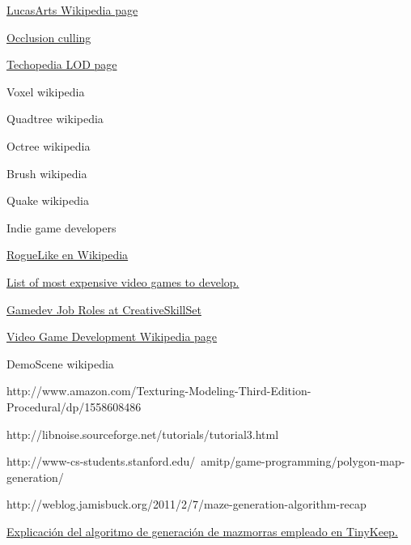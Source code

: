 \begin{thebibliography}{99}


 \href{https://es.wikipedia.org/wiki/LucasArts}{LucasArts Wikipedia page}

 \href{https://en.wikipedia.org/wiki/Hidden_surface_determination}{Occlusion culling}

 \href{http://www.techopedia.com/definition/11791/level-of-detail-lod}{Techopedia LOD page}

 Voxel wikipedia

 Quadtree wikipedia

 Octree wikipedia

 Brush wikipedia

 Quake wikipedia

 Indie game developers

 \href{https://es.wikipedia.org/wiki/Roguelike}{RogueLike en Wikipedia}

 \href{https://en.wikipedia.org/wiki/List_of_most_expensive_video_games_to_develop}{List of most expensive video games to develop.}

 \href{http://creativeskillset.org/creative_industries/games/job_roles}{Gamedev Job Roles at CreativeSkillSet}

 \href{https://en.wikipedia.org/wiki/Video_game_development#Roles}{Video Game Development Wikipedia page}

 DemoScene wikipedia

 http://www.amazon.com/Texturing-Modeling-Third-Edition-Procedural/dp/1558608486

 http://libnoise.sourceforge.net/tutorials/tutorial3.html

 http://www-cs-students.stanford.edu/~amitp/game-programming/polygon-map-generation/

 http://weblog.jamisbuck.org/2011/2/7/maze-generation-algorithm-recap

 \href{http://www.reddit.com/r/gamedev/comments/1dlwc4/procedural_dungeon_generation_algorithm_explained/}{Explicación del algoritmo de generación de mazmorras empleado en TinyKeep.}

\end{thebibliography}







